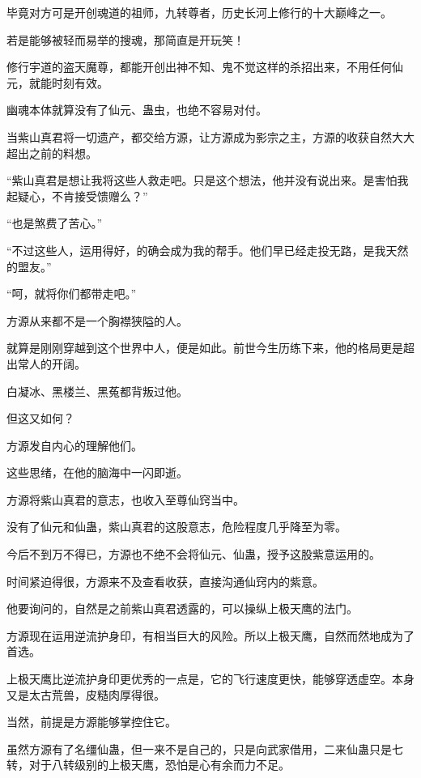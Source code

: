 
\begin{this_body}



毕竟对方可是开创魂道的祖师，九转尊者，历史长河上修行的十大巅峰之一。

若是能够被轻而易举的搜魂，那简直是开玩笑！

修行宇道的盗天魔尊，都能开创出神不知、鬼不觉这样的杀招出来，不用任何仙元，就能时刻有效。

幽魂本体就算没有了仙元、蛊虫，也绝不容易对付。

当紫山真君将一切遗产，都交给方源，让方源成为影宗之主，方源的收获自然大大超出之前的料想。

“紫山真君是想让我将这些人救走吧。只是这个想法，他并没有说出来。是害怕我起疑心，不肯接受馈赠么？”

“也是煞费了苦心。”

“不过这些人，运用得好，的确会成为我的帮手。他们早已经走投无路，是我天然的盟友。”

“呵，就将你们都带走吧。”

方源从来都不是一个胸襟狭隘的人。

就算是刚刚穿越到这个世界中人，便是如此。前世今生历练下来，他的格局更是超出常人的开阔。

白凝冰、黑楼兰、黑菟都背叛过他。

但这又如何？

方源发自内心的理解他们。

这些思绪，在他的脑海中一闪即逝。

方源将紫山真君的意志，也收入至尊仙窍当中。

没有了仙元和仙蛊，紫山真君的这股意志，危险程度几乎降至为零。

今后不到万不得已，方源也不绝不会将仙元、仙蛊，授予这股紫意运用的。

时间紧迫得很，方源来不及查看收获，直接沟通仙窍内的紫意。

他要询问的，自然是之前紫山真君透露的，可以操纵上极天鹰的法门。

方源现在运用逆流护身印，有相当巨大的风险。所以上极天鹰，自然而然地成为了首选。

上极天鹰比逆流护身印更优秀的一点是，它的飞行速度更快，能够穿透虚空。本身又是太古荒兽，皮糙肉厚得很。

当然，前提是方源能够掌控住它。

虽然方源有了名缰仙蛊，但一来不是自己的，只是向武家借用，二来仙蛊只是七转，对于八转级别的上极天鹰，恐怕是心有余而力不足。


\end{this_body}
